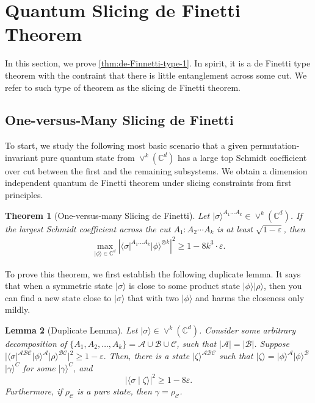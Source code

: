 \documentclass[10pt,a4paper]{article}
\newtheorem{theorem}{Theorem}[section]
\newtheorem{lemma}[theorem]{Lemma}
\theoremstyle{remark}
\def\epsilon{\varepsilon}
\newcommand{\C}{{\mathbb C}}
\newcommand{\cA}{\mathcal{A}}
\newcommand{\cB}{\mathcal{B}}
\newcommand{\cC}{\mathcal{C}}
\newcommand{\abs}[1]{\ensuremath{\left\lvert #1 \right\rvert}}
\newcommand{\1}[1]{\mathds{1}{[#1]}}
\newcommand{\ket}[1]{\lvert #1\rangle}
\newcommand{\Symm}[2]{\vee^{#1}(\C^{#2})}
\newcommand{\bra}[1]{\langle#1|}
\numberwithin{equation}{section}
\begin{document}
\section{Quantum Slicing de Finetti Theorem}\label{sec:de_finetti}

In this section, we prove \cref{thm:de-Finnetti-type-1}. In spirit, it is a de Finetti type theorem with the contraint that there is little entanglement across some cut. We refer to such type of theorem as the slicing de Finetti theorem.


\subsection{One-versus-Many Slicing de Finetti}
To start, we study the following most basic scenario that a given permutation-invariant pure quantum state from $\Symm{k}{d}$ has a large top Schmidt coefficient over cut between the first and the remaining subsystems. We obtain a dimension independent quantum de Finetti theorem under slicing constraints from first principles.


\begin{theorem}[One-versus-many Slicing de Finetti]\label{thm:one_vs_many}
Let $\ket{\sigma}^{A_1\ldots A_k} \in \vee^k(\C^d)$. If the largest Schmidt coefficient across
the cut $A_1:A_2\cdots A_k$ is at least $\sqrt{1-\epsilon}$, then
  \begin{align*}
    \max_{\ket{\phi} \in \C^d} \abs{\bra{\sigma}^{A_1\ldots A_k} \ket{\phi}^{\otimes k} }^2  \ge 1 - 8k^3\cdot \epsilon.
  \end{align*}
\end{theorem}



To prove this theorem, we first establish the following duplicate lemma. It says that when a symmetric state $\ket\sigma$ is close to some product state $\ket\phi\ket\rho$, then you can find a new state close to $\ket\sigma$ that with two $\ket\phi$ and harms the closeness only mildly.
\begin{lemma}[Duplicate Lemma]\label{lem:dup}
Let $\ket{\sigma}\in \Symm{k}{d}$. 
Consider some arbitrary decomposition of $\{A_1,A_2,\ldots, A_k\}=\cA\cup \cB \cup \cC$,
such that $|\cA|=|\cB|$. Suppose $ |\bra\sigma ^{\cA\cB\cC} \ket\phi^{\cA} \ket\rho^{\cB\cC}|^2 \ge 1-\epsilon. $
Then, there is a state $\ket\zeta^{\cA\cB\cC}$ such that $\ket\zeta=\ket\phi^\cA\ket\phi^\cB$ $\ket\gamma^{C}$ for some $\ket\gamma^C$, and
    \[
        |\langle\sigma\mid \zeta\rangle|^2 \ge 1-8\epsilon.
    \]
Furthermore, if $\rho_\cC$ is a pure state, then $\gamma = \rho_\cC$.
\end{lemma}
\end{document}
